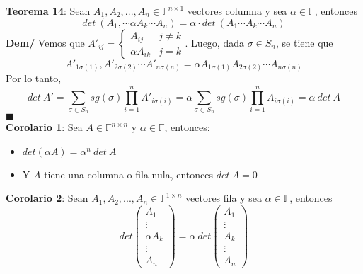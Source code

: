 \documentclass[11pt,a4paper]{article}
\newcommand*{\QEDA}{\null\nobreak\hfill\ensuremath{\blacksquare}}
\begin{document}
\textbf{Teorema 14}: Sean $A_1, A_2, ..., A_n \in \mathbb{F}^{n \times 1}$ vectores columna y sea $\alpha \in \mathbb{F}$, entonces $$det\ (A_1, \cdots \alpha A_k \cdots A_n) = \alpha \cdot det\ (A_1 \cdots A_k \cdots A_n)$$
\textbf{Dem/} Vemos que $A'_{ij} = \left\{ \begin{array}{ll} A_{ij} & j \not = k \\ \alpha A_{ik} & j = k\end{array}\right.$. Luego, dada $\sigma \in S_n$, se tiene que $$A'_{1\sigma(1)}, A'_{2\sigma(2)} \cdots A'_{n\sigma(n)} = \alpha A_{1\sigma(1)} A_{2\sigma(2)} \cdots A_{n\sigma(n)}$$
Por lo tanto, $$det\ A' = \sum_{\sigma \in S_n} sg(\sigma) \prod_{i = 1}^n A'_{i\sigma(i)} = \alpha \sum_{\sigma \in S_n} sg(\sigma) \prod_{i = 1}^n A_{i \sigma(i)} = \alpha\ det\ A$$ \QEDA\\
\textbf{Corolario 1}: Sea $A \in \mathbb{F}^{n \times n}$ y $\alpha \in \mathbb{F}$, entonces:
\begin{itemize}
\itemsep-0.3em
\item $det(\alpha A) = \alpha^n\ det\ A$
\item Y $A$ tiene una columna o fila nula, entonces $det\ A = 0$
\end{itemize}

\textbf{Corolario 2}: Sean $A_1, A_2, ..., A_n \in \mathbb{F}^{1 \times n}$ vectores fila y sea $\alpha \in \mathbb{F}$, entonces $$det\left( \begin{array}{c} A_1 \\ \vdots \\ \alpha A_k \\ \vdots \\ A_n \end{array}\right) = \alpha\ det\left( \begin{array}{c} A_1 \\ \vdots \\ A_k \\ \vdots \\ A_n \end{array}\right)$$

\newpage
\end{document}
